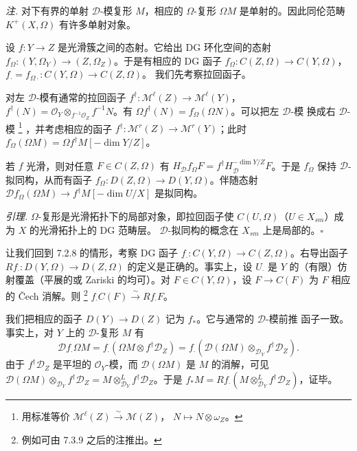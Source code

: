 \emph{注.} 对下有界的单射 $\mathcal{D}$-模复形 $M$，相应的 $\Omega$-复形
$\Omega M$ 是单射的。因此同伦范畴 $K^{+}(X,\Omega)$ 有许多单射对象。

 设 $f:Y\to Z$ 是光滑簇之间的态射。它给出 DG 环化空间的态射
$f_{\Omega}:(Y,\Omega_Y)\to(Z,\Omega_Z)$。于是有相应的 DG 函子
$f_{\Omega}^{\cdot}:C(Z,\Omega)\to C(Y,\Omega)$，
$f_{\cdot}=f_{\Omega\cdot}:C(Y,\Omega)\to C(Z,\Omega)$。
我们先考察拉回函子。


对左 $\mathcal{D}$-模有通常的拉回函子
$f^{\dagger}:\mathcal{M}^{\ell}(Z)\to\mathcal{M}^{\ell}(Y)$，
$f^{\dagger}(N)=\mathcal{O}_Y\otimes_{f^{-1}\mathcal{O}_Z}f^{-1}N$。有
$\Omega f^{\dagger}(N)=f_{\Omega}^{\cdot}(\Omega N)$。可以把左 $\mathcal{D}$-模
换成右 $\mathcal{D}$-模%
\footnote{用标准等价
$\mathcal{M}^{\ell}(Z)\xrightarrow{\sim}\mathcal{M}(Z)$，
$N\mapsto N\otimes\omega_Z$。}%
，并考虑相应的函子
$f^{\dagger}:\mathcal{M}^{r}(Z)\to\mathcal{M}^{r}(Y)$；此时
$f_{\Omega}^{\cdot}(\Omega M)=\Omega f^{\dagger}M[-\dim Y/Z]$。

若 $f$ 光滑，则对任意 $F\in C(Z,\Omega)$ 有
$H_{\mathcal{D}}^{\cdot}f_{\Omega}^{\cdot}F
=f^{\dagger}H_{\mathcal{D}}^{-\dim Y/Z}F$。于是 $f_{\Omega}^{\cdot}$ 保持
$\mathcal{D}$-拟同构，从而有函子
$f_{\Omega}^{\cdot}:D(Z,\Omega)\to D(Y,\Omega)$。伴随态射
$\mathcal{D}f_{\Omega}^{\cdot}(\Omega M)\to f^{\dagger}M[-\dim U/X]$ 是拟同构。

 \emph{引理.} $\Omega$-复形是光滑拓扑下的局部对象，即拉回函子使
$C(U,\Omega)$（$U\in X_{sm}$）成为 $X$ 的光滑拓扑上的 DG 范畴层。
$\mathcal{D}$-拟同构的概念在 $X_{sm}$ 上是局部的。\hfill$\square$

 让我们回到 7.2.8 的情形，考察 DG 函子
$f_{\cdot}:C(Y,\Omega)\to C(Z,\Omega)$。右导出函子
$Rf_{\cdot}:D(Y,\Omega)\to D(Z,\Omega)$ 的定义是正确的。事实上，设
$U_{\cdot}$ 是 $Y$ 的（有限）仿射覆盖（平展的或 Zariski 的均可）。对
$F\in C(Y,\Omega)$，设 $F\to C(F)$ 为 $F$ 相应的 Čech 消解。则
\footnote{例如可由 7.3.9 之后的注推出。}
$f_{\cdot}C(F)\xrightarrow{\sim}Rf_{\cdot}F$。

我们把相应的函子 $D(Y)\to D(Z)$ 记为 $f_{*}$。它与通常的 $\mathcal{D}$-模前推
函子一致。事实上，对 $Y$ 上的 $\mathcal{D}$-复形 $M$ 有
\[
\mathcal{D}f_{\cdot}\Omega M=f_{\cdot}(\Omega M\otimes f^{\dagger}\mathcal{D}_Z)
=f_{\cdot}(\mathcal{D}(\Omega M)\otimes_{\mathcal{D}_Y}f^{\dagger}\mathcal{D}_Z).
\]
由于 $f^{\dagger}\mathcal{D}_Z$ 是平坦的 $\mathcal{O}_Y$-模，而
$\mathcal{D}(\Omega M)$ 是 $M$ 的消解，可见
$\mathcal{D}(\Omega M)\otimes_{\mathcal{D}_Y}f^{\dagger}\mathcal{D}_Z
=M\otimes^{L}_{\mathcal{D}_Y}f^{\dagger}\mathcal{D}_Z$。于是
$f_{*}M=Rf_{\cdot}(M\otimes^{L}_{\mathcal{D}_Y}f^{\dagger}\mathcal{D}_Z)$，证毕。

